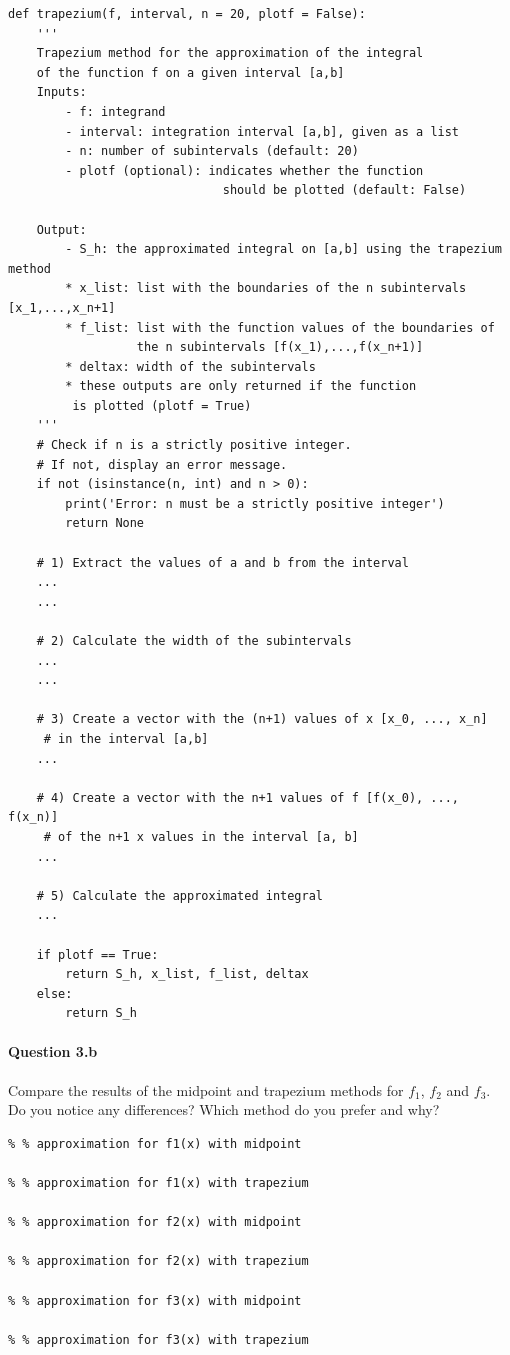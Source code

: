 \begin{lstlisting}
def trapezium(f, interval, n = 20, plotf = False):
    '''
    Trapezium method for the approximation of the integral 
    of the function f on a given interval [a,b]
    Inputs: 
        - f: integrand
        - interval: integration interval [a,b], given as a list
        - n: number of subintervals (default: 20)
        - plotf (optional): indicates whether the function
                              should be plotted (default: False)
        
    Output:
        - S_h: the approximated integral on [a,b] using the trapezium method
        * x_list: list with the boundaries of the n subintervals [x_1,...,x_n+1]
        * f_list: list with the function values of the boundaries of
                  the n subintervals [f(x_1),...,f(x_n+1)]
        * deltax: width of the subintervals
        * these outputs are only returned if the function
         is plotted (plotf = True)
    '''
    # Check if n is a strictly positive integer.
    # If not, display an error message.
    if not (isinstance(n, int) and n > 0):
        print('Error: n must be a strictly positive integer')
        return None
    
    # 1) Extract the values of a and b from the interval
    ...
    ...
    
    # 2) Calculate the width of the subintervals
    ...
    ...
    
    # 3) Create a vector with the (n+1) values of x [x_0, ..., x_n]
     # in the interval [a,b]
    ...
    
    # 4) Create a vector with the n+1 values of f [f(x_0), ..., f(x_n)]
     # of the n+1 x values in the interval [a, b]
    ...
    
    # 5) Calculate the approximated integral
    ...
    
    if plotf == True:
        return S_h, x_list, f_list, deltax
    else:
        return S_h
\end{lstlisting}


\paragraph{Question 3.b}
Compare the results of the midpoint and trapezium methods for $f_1$, $f_2$ and $f_3$. Do you notice any differences? Which method do you prefer and why?


\begin{lstlisting}
% % approximation for f1(x) with midpoint

% % approximation for f1(x) with trapezium

% % approximation for f2(x) with midpoint

% % approximation for f2(x) with trapezium

% % approximation for f3(x) with midpoint

% % approximation for f3(x) with trapezium

\end{lstlisting}


